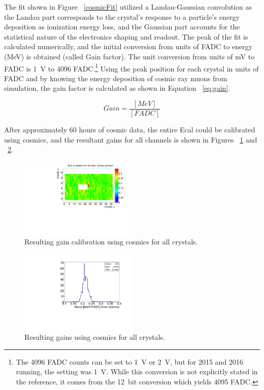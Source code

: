 \documentclass[twoside]{article}
\begin{document}
\begin{multicols}{2}
The fit shown in Figure ~\ref{cosmicFit} utilized a Landau-Gaussian convolution as the Landau part corresponds to the crystal's response to a particle's energy deposition as ionization energy loss, and the Gaussian part accounts for the statistical nature of the electronics shaping and readout. The peak of the fit is calculated numerically, and the initial conversion from units of FADC to energy (MeV) is obtained (called Gain factor). The unit conversion from units of mV to FADC is 1~V to 4096 FADC.\footnote{The 4096 FADC counts can be set to 1~V or 2~V, but for 2015 and 2016 running, the setting was 1~V. While this conversion is not explicitly stated in the reference\cite{CODA}, it comes from the 12~bit conversion which yields 4095 FADC.} Using the peak position for each crystal in units of FADC and by knowing the energy deposition of cosmic ray muons from simulation, the gain factor is calculated as shown in Equation ~\eqref{eq:gain}.

\begin{equation}
\label{eq:gain}
Gain = \dfrac{[MeV]}{[FADC]} 
\end{equation}
	 
After approximately 60 hours of cosmic data, the entire Ecal could be calibrated using cosmics, and the resultant gains for all channels is shown in Figures ~\ref{cosmicGain} and ~\ref{cosmicGain1D}.

\begin{figure}[H]
  \centering
      \includegraphics[width=0.48\textwidth]{pics/cosmicGains_2015.pdf}
  \caption{Resulting gain calibration using cosmics for all crystals.}
  \label{cosmicGain}
\end{figure}

\begin{figure}[H]
  \centering
      \includegraphics[width=0.5\textwidth]{pics/cosmicGainsMay15.pdf}
  \caption{Resulting gains using cosmics for all crystals.}
  \label{cosmicGain1D}
\end{figure}
	

\end{multicols}
\end{document}
